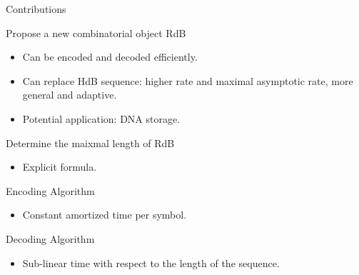 \begin{frame}{Contributions}
    \begin{block}{Propose a new combinatorial object RdB}
        \begin{itemize}
            \item Can be encoded and decoded efficiently.
            \item Can replace HdB sequence: higher rate and maximal asymptotic rate, more general and adaptive.
            \item Potential application: DNA storage.
        \end{itemize}
    \end{block}
    \begin{block}{Determine the maixmal length of RdB}
        \begin{itemize}
            \item Explicit formula.
        \end{itemize}
    \end{block}
    \begin{block}{Encoding Algorithm}
        \begin{itemize}
            \item Constant amortized time per symbol.
        \end{itemize}
    \end{block}
    \begin{block}{Decoding Algorithm}
        \begin{itemize}
            \item Sub-linear time with respect to the length of the sequence.
        \end{itemize}
    \end{block}
\end{frame} 